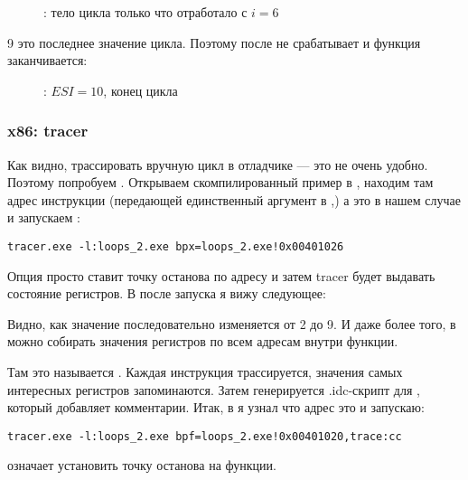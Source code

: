 \begin{figure}[H]
\centering
{}
\caption{\olly: тело цикла только что отработало с $i=6$}
\label{fig:loops_olly_2}
\end{figure}

9 это последнее значение цикла.
Поэтому \JL после  не срабатывает и функция заканчивается:

\begin{figure}[H]
\centering
{}
\caption{\olly: $ESI=10$, конец цикла}
\label{fig:loops_olly_3}
\end{figure}

\subsubsection{x86: tracer}

Как видно, трассировать вручную цикл в отладчике --- это не очень удобно.
Поэтому попробуем \tracer.
Открываем скомпилированный пример в \IDA, находим там адрес инструкции 
(передающей единственный аргумент в \ttf,)
а это  в нашем случае и запускаем \tracer:

\begin{lstlisting}
tracer.exe -l:loops_2.exe bpx=loops_2.exe!0x00401026
\end{lstlisting}

Опция  просто ставит точку останова по адресу и затем tracer будет выдавать состояние регистров.
В  после запуска я вижу следующее:



Видно, как значение \ESI последовательно изменяется от 2 до 9.
И даже более того, в \tracer можно собирать значения регистров по всем адресам внутри функции.

Там это называется .
Каждая инструкция трассируется, значения самых интересных регистров запоминаются.
Затем генерируется .idc-скрипт для \IDA, который добавляет комментарии.
Итак, в \IDA я узнал что адрес \main это  и запускаю:

\begin{lstlisting}
tracer.exe -l:loops_2.exe bpf=loops_2.exe!0x00401020,trace:cc
\end{lstlisting}

 означает установить точку останова на функции.

